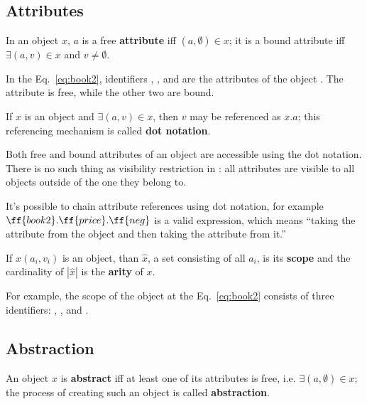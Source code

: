 \subsection{Attributes}

\begin{eodefinition}\label{def:attribute}
In an object $x$, $a$ is a free \textbf{attribute}
iff $(a, \emptyset) \in x$; it is a bound attribute
iff $\exists (a, v)\in x$ and $v\not=\emptyset$.
\end{eodefinition}

In the Eq.~\ref{eq:book2}, identifiers , , and 
are the attributes of the object .
The attribute  is free, while the other two are bound.

\begin{eodefinition}\label{def:dot}
If $x$ is an object and $\exists (a, v) \in x$, then $v$ may be referenced as $x.a$;
this referencing mechanism is called \textbf{dot notation}.
\end{eodefinition}

Both free and bound attributes of an object are accessible using
the dot notation. There is no such thing as
visibility restriction in \phic{}:
all attributes are visible to all objects outside of the one they belong to.

It's possible to chain attribute references using dot notation, for example
$\ff{book2}.\ff{price}.\ff{neg}$ is a valid expression, which means
``taking the attribute  from the object  and then
taking the attribute  from it.''

\begin{eodefinition}\label{def:scope}
If $x(a_i, v_i)$ is an object, than $\hat{x}$, a set consisting of all $a_i$,
is its \textbf{scope} and the cardinality of $|\hat{x}|$ is
the \textbf{arity} of $x$.
\end{eodefinition}

For example, the scope of the object at the Eq.~\ref{eq:book2} consists of three identifiers:
, , and .

\subsection{Abstraction}

\begin{eodefinition}\label{def:abstraction}
An object $x$ is \textbf{abstract} iff at least one of its attributes is free,
i.e. $\exists (a, \emptyset)\in x$;
the process of creating such an object is called \textbf{abstraction}.
\end{eodefinition}

